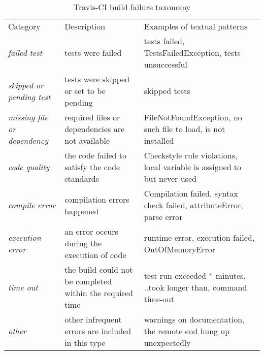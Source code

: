 
\begin{table}[t] \centering
\small
  \caption{Travis-CI build failure taxonomy
  \vspace{-0.2cm}
  }
  \label{error_types}

\begin{tabular}{ p{1.5cm}  p{2.5cm}  p{4cm} }
	
\hline 
\\[-1.8ex]\hline
Category & Description & Examples of textual patterns \\ \hline 
\emph{failed test} & tests were failed & tests failed, TestsFailedException, tests unsuccessful\\ \hline
\emph{skipped or pending test} & tests were skipped or set to be pending & skipped tests \\ \hline
\emph{missing file or dependency} & required files or dependencies are not available &  FileNotFoundException, no such file to load, is not installed \\ \hline
\emph{code quality} & the code failed to satisfy the code standards &  Checkstyle rule violations, local variable is assigned to but never used\\ \hline
\emph{compile error} &compilation errors happened & Compilation failed, syntax check failed, attributeError, parse error\\ \hline
\emph{execution error} &an error occurs during the execution of code & runtime error, execution failed, OutOfMemoryError\\ \hline
\emph{time out} & the build could not be completed within the required time& test run exceeded * minutes, ..took longer than, command time-out \\ \hline 
\emph{other} &other infrequent errors are included in this type & warnings on documentation, the remote end hung up unexpectedly \\
\hline

\end{tabular}

\end{table}

